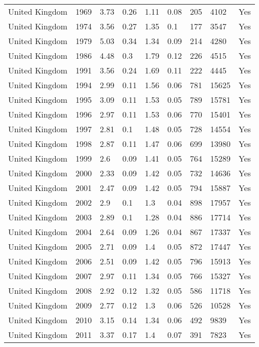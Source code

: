 \begin{tabular}{lllllllll}
United Kingdom & 1969 & 3.73 & 0.26 & 1.11 & 0.08 & 205 & 4102 & Yes \\ 
United Kingdom & 1974 & 3.56 & 0.27 & 1.35 & 0.1 & 177 & 3547 & Yes \\ 
United Kingdom & 1979 & 5.03 & 0.34 & 1.34 & 0.09 & 214 & 4280 & Yes \\ 
United Kingdom & 1986 & 4.48 & 0.3 & 1.79 & 0.12 & 226 & 4515 & Yes \\ 
United Kingdom & 1991 & 3.56 & 0.24 & 1.69 & 0.11 & 222 & 4445 & Yes \\ 
United Kingdom & 1994 & 2.99 & 0.11 & 1.56 & 0.06 & 781 & 15625 & Yes \\ 
United Kingdom & 1995 & 3.09 & 0.11 & 1.53 & 0.05 & 789 & 15781 & Yes \\ 
United Kingdom & 1996 & 2.97 & 0.11 & 1.53 & 0.06 & 770 & 15401 & Yes \\ 
United Kingdom & 1997 & 2.81 & 0.1 & 1.48 & 0.05 & 728 & 14554 & Yes \\ 
United Kingdom & 1998 & 2.87 & 0.11 & 1.47 & 0.06 & 699 & 13980 & Yes \\ 
United Kingdom & 1999 & 2.6 & 0.09 & 1.41 & 0.05 & 764 & 15289 & Yes \\ 
United Kingdom & 2000 & 2.33 & 0.09 & 1.42 & 0.05 & 732 & 14636 & Yes \\ 
United Kingdom & 2001 & 2.47 & 0.09 & 1.42 & 0.05 & 794 & 15887 & Yes \\ 
United Kingdom & 2002 & 2.9 & 0.1 & 1.3 & 0.04 & 898 & 17957 & Yes \\ 
United Kingdom & 2003 & 2.89 & 0.1 & 1.28 & 0.04 & 886 & 17714 & Yes \\ 
United Kingdom & 2004 & 2.64 & 0.09 & 1.26 & 0.04 & 867 & 17337 & Yes \\ 
United Kingdom & 2005 & 2.71 & 0.09 & 1.4 & 0.05 & 872 & 17447 & Yes \\ 
United Kingdom & 2006 & 2.51 & 0.09 & 1.42 & 0.05 & 796 & 15913 & Yes \\ 
United Kingdom & 2007 & 2.97 & 0.11 & 1.34 & 0.05 & 766 & 15327 & Yes \\ 
United Kingdom & 2008 & 2.92 & 0.12 & 1.32 & 0.05 & 586 & 11718 & Yes \\ 
United Kingdom & 2009 & 2.77 & 0.12 & 1.3 & 0.06 & 526 & 10528 & Yes \\ 
United Kingdom & 2010 & 3.15 & 0.14 & 1.34 & 0.06 & 492 & 9839 & Yes \\ 
United Kingdom & 2011 & 3.37 & 0.17 & 1.4 & 0.07 & 391 & 7823 & Yes \\ 

\end{tabular}
